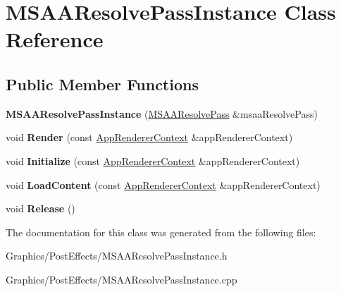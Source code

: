 \hypertarget{classMSAAResolvePassInstance}{}\section{M\+S\+A\+A\+Resolve\+Pass\+Instance Class Reference}
\label{classMSAAResolvePassInstance}
\subsection*{Public Member Functions}
\begin{DoxyCompactItemize}
\item 
\mbox{\label{classMSAAResolvePassInstance_a3026db2c165d35b49af911ac1c0ea0be}} 
{\bfseries M\+S\+A\+A\+Resolve\+Pass\+Instance} (\hyperlink{classMSAAResolvePass}{M\+S\+A\+A\+Resolve\+Pass} \&msaa\+Resolve\+Pass)
\item 
\mbox{\label{classMSAAResolvePassInstance_a10a7d78a63417e17ba072a2ae73ffeb4}} 
void {\bfseries Render} (const \hyperlink{structAppRendererContext}{App\+Renderer\+Context} \&app\+Renderer\+Context)
\item 
\mbox{\label{classMSAAResolvePassInstance_a09d345d51c30b1cf503456fe51ca6f22}} 
void {\bfseries Initialize} (const \hyperlink{structAppRendererContext}{App\+Renderer\+Context} \&app\+Renderer\+Context)
\item 
\mbox{\label{classMSAAResolvePassInstance_ac9e09b77cfb497dae57658b3f2708222}} 
void {\bfseries Load\+Content} (const \hyperlink{structAppRendererContext}{App\+Renderer\+Context} \&app\+Renderer\+Context)
\item 
\mbox{\label{classMSAAResolvePassInstance_aaabe2930a59578187a218d25715752a8}} 
void {\bfseries Release} ()
\end{DoxyCompactItemize}


The documentation for this class was generated from the following files\+:\begin{DoxyCompactItemize}
\item 
Graphics/\+Post\+Effects/M\+S\+A\+A\+Resolve\+Pass\+Instance.\+h\item 
Graphics/\+Post\+Effects/M\+S\+A\+A\+Resolve\+Pass\+Instance.\+cpp\end{DoxyCompactItemize}
